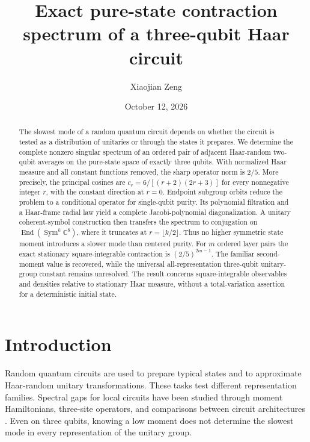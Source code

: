 \documentclass[aps,pra,reprint,amsmath,amssymb,longbibliography]{revtex4-2}
\newcommand{\C}{\mathbb C}
\newcommand{\Sym}{\operatorname{Sym}}
\newcommand{\End}{\operatorname{End}}
\begin{document}
\title{Exact pure-state contraction spectrum of a three-qubit Haar circuit}
\author{Xiaojian Zeng}
\date{October 12, 2026}

\begin{abstract}
The slowest mode of a random quantum circuit depends on whether the circuit is tested as a distribution of unitaries or through the states it prepares. We determine the complete nonzero singular spectrum of an ordered pair of adjacent Haar-random two-qubit averages on the pure-state space of exactly three qubits. With normalized Haar measure and all constant functions removed, the sharp operator norm is $2/5$. More precisely, the principal cosines are $c_r=6/[(r+2)(2r+3)]$ for every nonnegative integer $r$, with the constant direction at $r=0$. Endpoint subgroup orbits reduce the problem to a conditional operator for single-qubit purity. Its polynomial filtration and a Haar-frame radial law yield a complete Jacobi-polynomial diagonalization. A unitary coherent-symbol construction then transfers the spectrum to conjugation on $\End(\Sym^k\C^8)$, where it truncates at $r=\lfloor k/2\rfloor$. Thus no higher symmetric state moment introduces a slower mode than centered purity. For $m$ ordered layer pairs the exact stationary square-integrable contraction is $(2/5)^{2m-1}$. The familiar second-moment value is recovered, while the universal all-representation three-qubit unitary-group constant remains unresolved. The result concerns square-integrable observables and densities relative to stationary Haar measure, without a total-variation assertion for a deterministic initial state.
\end{abstract}
\maketitle

\section{Introduction}

Random quantum circuits are used to prepare typical states and to approximate Haar-random unitary transformations. These tasks test different representation families. Spectral gaps for local circuits have been studied through moment Hamiltonians, three-site operators, and comparisons between circuit architectures \cite{Haferkamp2021,Allen2025,Deneris2025}. Even on three qubits, knowing a low moment does not determine the slowest mode in every representation of the unitary group.
\end{document}
